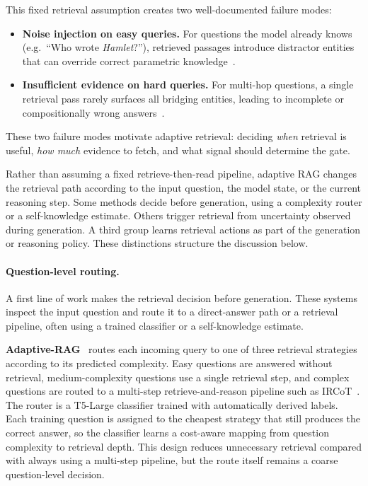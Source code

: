 \documentclass{nthu_thesis}
\begin{document}
\begin{thesiscjk}
This fixed retrieval assumption creates two well-documented failure modes:

\begin{itemize}
    \item \textbf{Noise injection on easy queries.} For questions the model already knows (e.g.\ ``Who wrote \emph{Hamlet}?''), retrieved passages introduce distractor entities that can override correct parametric knowledge~\cite{popqa,ren2023}.
    \item \textbf{Insufficient evidence on hard queries.} For multi-hop questions, a single retrieval pass rarely surfaces all bridging entities, leading to incomplete or compositionally wrong answers~\cite{ircot}.
\end{itemize}

These two failure modes motivate adaptive retrieval: deciding \emph{when} retrieval is \mbox{useful}, \emph{how much} evidence to fetch, and what signal should determine the gate.

Rather than assuming a fixed retrieve-then-read pipeline, adaptive RAG changes the retrieval path according to the input question, the model state, or the current \mbox{reasoning} step. Some methods decide before generation, using a complexity router or a self-knowledge estimate. Others trigger retrieval from uncertainty observed during generation. A third group learns retrieval actions as part of the generation or reasoning policy. These distinctions structure the discussion below.

\paragraph{Question-level routing.}

A first line of work makes the retrieval decision before generation. These systems inspect the input question and route it to a direct-answer path or a retrieval pipeline, often using a trained classifier or a self-knowledge estimate.

\textbf{Adaptive-RAG}~\cite{adaptiverag} routes each incoming query to one of three retrieval strategies according to its predicted complexity. Easy questions are answered without retrieval, medium-complexity questions use a single retrieval step, and complex questions are routed to a multi-step retrieve-and-reason pipeline such as IRCoT~\cite{ircot}. The router is a T5-Large classifier trained with automatically derived labels. Each training question is assigned to the cheapest strategy that still produces the correct answer, so the classifier learns a cost-aware mapping from question complexity to retrieval depth. This design reduces unnecessary retrieval compared with always using a multi-step pipeline, but the route itself remains a coarse question-level decision.


\end{thesiscjk}
\end{document}
